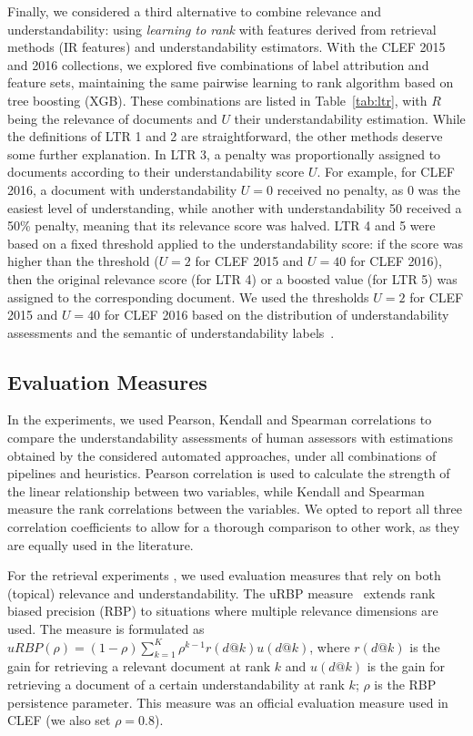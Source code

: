 \documentclass[10pt,a4paper]{article}
\begin{document}
Finally, we considered a third alternative to combine relevance and understandability: using \textit{learning to rank} with features derived from retrieval methods (IR features) and understandability estimators.
With the CLEF 2015 and 2016 collections, we explored five combinations of label attribution and feature sets, maintaining the same pairwise learning to rank algorithm based on tree boosting (XGB).
These combinations are listed in Table~\ref{tab:ltr}, with $R$ being the relevance of documents and $U$ their understandability estimation. While the definitions of LTR 1 and 2 are straightforward, the other methods deserve some further explanation. In LTR 3, a penalty was proportionally assigned to documents according to their understandability score $U$. For example, for CLEF 2016, a document with understandability $U=0$ received no penalty, as 0 was the easiest level of understanding, while another with understandability 50 received a 50\% penalty, meaning that its relevance score was halved. LTR 4 and 5 were based on a fixed threshold applied to the understandability score: if the score was higher than the threshold ($U=2$ for CLEF 2015 and $U=40$ for CLEF 2016), then the original relevance score (for LTR 4) or a boosted value (for LTR 5) was assigned to the corresponding document. We used the thresholds $U=2$ for CLEF 2015 and $U=40$ for CLEF 2016 based on the distribution of
understandability assessments and the semantic of understandability labels~\cite{clef15,clef16}.


\subsection*{Evaluation Measures}

In the experiments, we used Pearson, Kendall and Spearman correlations to compare the understandability assessments of human assessors with estimations obtained by the considered automated approaches, under all combinations of pipelines and heuristics. Pearson correlation is used to calculate the strength of the linear relationship between two variables, while Kendall and Spearman measure the rank correlations between the variables. We opted to report all three correlation coefficients to allow for a thorough comparison to other work, as they are equally used in the literature. 

For the retrieval experiments , we used evaluation measures that rely on both (topical) relevance and understandability. 
The uRBP measure~\cite{zuccon2016understandability} extends rank biased precision (RBP) to situations where multiple relevance dimensions are used. The measure is formulated as $uRBP(\rho) = (1 - \rho) \sum_{k=1}^{K} \rho^{k-1} r(d@k) u(d@k)$, where $r(d@k)$ is the gain for retrieving a relevant document at rank $k$ and $u(d@k)$ is the gain for retrieving a document of a certain understandability at rank $k$; $\rho$ is the RBP persistence parameter. This measure was an official evaluation measure used in CLEF (we also set $\rho=0.8$). 
\end{document}
